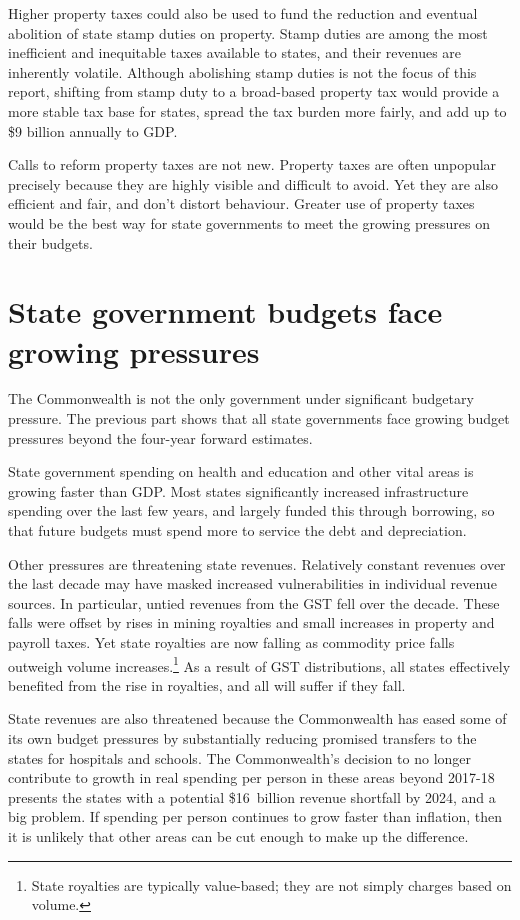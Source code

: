 \documentclass[twoside,english]{palatinob5ona4portrait}
\begin{document}
\begin{overview}[-25pt]
Higher property taxes could also be used to fund the reduction and eventual abolition of state stamp duties on property. Stamp duties are among the most inefficient and inequitable taxes available to states, and their revenues are inherently volatile. Although abolishing stamp duties is not the focus of this report, shifting from stamp duty to a broad-based property tax would provide a more stable tax base for states, spread the tax burden more fairly, and add up to \$9 billion annually to GDP. 

Calls to reform property taxes are not new. Property taxes are often unpopular precisely because they are highly visible and difficult to avoid. Yet they are also efficient and fair, and don’t distort behaviour. Greater use of property taxes would be the best way for state governments to meet the growing pressures on their budgets.
\end{overview}
\chapter{State government budgets face growing pressures}\label{chapter:PROP-1}
The Commonwealth is not the only government under significant budgetary pressure. The previous part shows that all state governments face growing budget pressures beyond the four-year forward estimates. 

State government spending on health and education and other vital areas is growing faster than GDP\@. Most states significantly increased infrastructure spending over the last few years, and largely funded this through borrowing, so that future budgets must spend more to service the debt and depreciation. 

Other pressures are threatening state revenues. Relatively constant revenues over the last decade may have masked increased vulnerabilities in individual revenue sources. In particular, untied revenues from the GST fell over the decade.  These falls were offset by rises in mining royalties and small increases in property and payroll taxes. Yet state royalties are now falling as commodity price falls outweigh volume increases.\footnote{State royalties are typically value-based; they are not simply charges based on volume.}  As a result of GST distributions, all states effectively benefited from the rise in royalties, and all will suffer if they fall. 

State revenues are also threatened because the Commonwealth has eased some of its own budget pressures by substantially reducing promised transfers to the states for hospitals and schools. The Commonwealth’s decision to no longer contribute to growth in real spending per person in these areas beyond 2017-18 presents the states with a potential \$16~billion revenue shortfall by 2024, and a big problem.  If spending per person continues to grow faster than inflation, then it is unlikely that other areas can be cut enough to make up the difference. 
\end{document}
